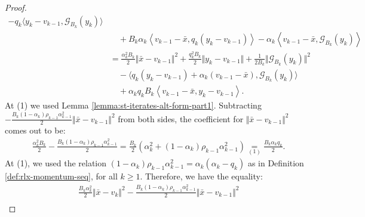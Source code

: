 \documentclass[12pt]{article}
\begin{document}
\begin{proof}
\begin{align*}
                - q_k\langle 
                    y_k - v_{k - 1}, \mathcal G_{B_k}(y_k)
                \rangle
                    \\ &\quad 
                    + 
                    B_k\alpha_k\left\langle 
                        v_{k - 1} - \bar x, 
                        q_k(y_k - v_{k - 1}) 
                    \right\rangle
                    - \alpha_k \left\langle 
                        v_{k - 1} - \bar x,
                        \mathcal G_{B_k}(y_k)
                    \right\rangle
                \\
                &= 
                \frac{\alpha_k^2B_k}{2}
                \Vert \bar x - v_{k - 1}\Vert^2
                + \frac{q_k^2B_k}{2}\Vert y_k - v_{k - 1} \Vert
                + \frac{1}{2B_k}\Vert \mathcal G_{B_k}(y_k)\Vert^2
                    \\ &\quad 
                    - \langle
                        q_k(y_k - v_{k - 1}) + \alpha_k(v_{k - 1} - \bar x), \mathcal G_{B_k}(y_k)
                    \rangle
                    \\ &\quad 
                    + \alpha_k q_k B_k
                    \left\langle 
                        v_{k - 1} - \bar x, 
                        y_k - v_{k - 1}
                    \right\rangle. 
            \end{align*}
            At (1) we used Lemma \ref{lemma:st-iterates-alt-form-part1}. 
            Subtracting $-\frac{B_k(1 - \alpha_k)\rho_{k - 1}\alpha_{k - 1}^2}{2}\Vert \bar x - v_{k - 1}\Vert^2$ from both sides, the coefficient for $\Vert \bar x - v_{k - 1}\Vert^2$ comes out to be: 
            \begin{align*}
                & \frac{\alpha_k^2B_k}{2}
                - \frac{B_k(1 - \alpha_k)\rho_{k - 1}\alpha_{k - 1}^2}{2} 
                = \frac{B_k}{2}(
                    \alpha_k^2 + (1 - \alpha_k)\rho_{k - 1}\alpha_{k - 1}^2
                )
                \underset{(1)}{=} \frac{B_k\alpha_kq_k}{2}. 
            \end{align*}
            At (1), we used the relation $(1 - \alpha_k)\rho_{k - 1}\alpha_{k - 1}^2 = \alpha_k(\alpha_k - q_k)$ as in Definition \ref{def:rlx-momentum-seq}, for all $k \ge 1$. 
            Therefore, we have the equality: 
            \begin{align*}
                &
                \frac{B_k\alpha_k^2}{2}\Vert \bar x - v_k\Vert^2 
                -\frac{B_k(1 - \alpha_k)\rho_{k - 1}\alpha_{k - 1}^2}{2}\Vert \bar x - v_{k - 1}\Vert^2
                \\

\end{align*}
\end{proof}
\end{document}

